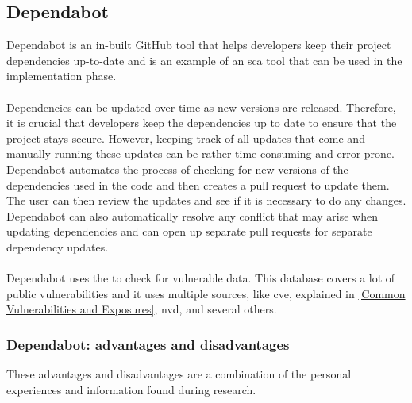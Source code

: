 \subsection{Dependabot}
Dependabot is an in-built GitHub tool that helps developers keep their project dependencies up-to-date and is an example of an \acrshort{sca} tool that can be used in the implementation phase.
\\~\\
Dependencies can be updated over time as new versions are released. Therefore, it is crucial that developers keep the dependencies up to date to ensure that the project stays secure. However, keeping track of all updates that come and manually running these updates can be rather time-consuming and error-prone. Dependabot automates the process of checking for new versions of the dependencies used in the code and then creates a pull request to update them. The user can then review the updates and see if it is necessary to do any changes. 
Dependabot can also automatically resolve any conflict that may arise when updating dependencies and can open up separate pull requests for separate dependency updates. \cite{GithubDependabot2}
\\~\\
Dependabot uses the  to check for vulnerable data. This database covers a lot of public vulnerabilities and it uses multiple sources, like \acrlong{cve}, explained in \ref{Common Vulnerabilities and Exposures}, \acrlong{nvd}, and several others. \cite{GithubDependabot1}

\subsubsection{Dependabot: advantages and disadvantages}
These advantages and disadvantages are a combination of the personal experiences and information found during research. \cite{prosconsdependabot} 

